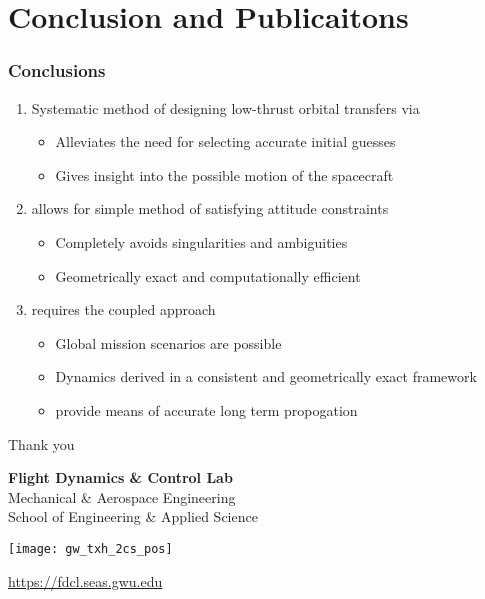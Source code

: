 

\section[Conclusion]{Conclusion and Publicaitons}


\begin{frame} %
\frametitle{Conclusions}
  \begin{enumerate}
    \item<1-> Systematic method of designing low-thrust orbital transfers via 
    \begin{itemize}
        \item Alleviates the need for selecting accurate initial guesses 
        \item Gives insight into the possible motion of the spacecraft
    \end{itemize}
    \item<2->  allows for simple method of satisfying attitude constraints
    \begin{itemize}
        \item Completely avoids singularities and ambiguities
        \item Geometrically exact and computationally efficient
    \end{itemize}
    \item<3->  requires the coupled approach 
    \begin{itemize}
        \item Global mission scenarios are possible
        \item Dynamics derived in a consistent and geometrically exact framework
        \item {} provide means of accurate long term propogation
    \end{itemize}

  \end{enumerate}
\end{frame}   %

\begin{frame}[c]{Thank you}
  \centering
  
  \textbf{\large Flight Dynamics \& Control Lab} \\
  Mechanical \& Aerospace Engineering \\
  School of Engineering \& Applied Science
  
  \begin{center} %
        \texttt{[image: gw\_txh\_2cs\_pos]}
    \end{center}
  
  \url{https://fdcl.seas.gwu.edu}
\end{frame}